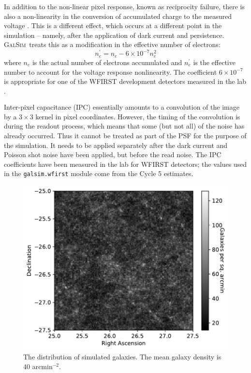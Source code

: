 \documentclass[usenatbib]{mnras}
\newcommand{\galsim}{\textsc{GalSim}}
\begin{document}
In addition to the non-linear pixel response, known as reciprocity failure, there is also a non-linearity in the conversion of accumulated charge to the measured voltage \citep{2017JInst..12C4009P,Biesiadzinski2011,10.1117/12.2314475}.
This is a different effect, which occurs at a different point in the simulation -- namely, after the application of dark current \citep{10.1117/12.790382,10.1117/12.2057308,10.1117/12.2233664} and persistence. 
\galsim\ treats this as a modification in the effective number of electrons:
\begin{equation}
n_e^\prime = n_e - 6 \times 10^{-7} n_e^2
\end{equation}
where $n_e$ is the actual number of electrons accumulated and $n_e^\prime$ is the effective number to account for the voltage response nonlinearity. The coefficient $6\times 10^{-7}$ is appropriate for one of the WFIRST development detectors measured in the lab \citep{2020PASP..132a4502C}.

Inter-pixel capacitance (IPC) \citep{2016PASP..128i5001K} essentially amounts to a convolution of the image by a $3 \times 3$ kernel in pixel coordinates.
However, the timing of the convolution is during the readout process, which means that some (but not all) of the noise has already occurred.  
Thus it cannot be treated as part of the PSF for the purpose of the simulation.  
It needs to be applied separately after the dark current and Poisson shot noise have been applied, but before the read noise.  
The IPC coefficients have been measured in the lab for WFIRST detectors; the values used in the \texttt{galsim.wfirst} module come from the Cycle 5 estimates. 

\begin{figure}
\begin{center}
\includegraphics[width=\columnwidth]{figures/galaxies.pdf}
\end{center}
\caption[]{
The distribution of simulated galaxies. The mean galaxy density is 40 arcmin$^{-2}$. 
\label{fig:galaxies}}
\end{figure}
\end{document}
